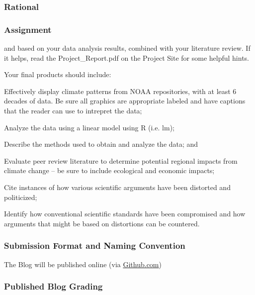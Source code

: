 
\subsubsection{Rational}

\subsubsection{Assignment}

and based on your data analysis results, combined with your literature review. If it helps, read the Project\_Report.pdf on the Project Site for some helpful hints.

Your final products should include:

\begin{itemize*}
  \item Effectively display climate patterns from NOAA repositories, with at least 6 decades of data. Be sure all graphics are appropriate labeled and have captions that the reader can use to intrepret the data;
  \item Analyze the data using a linear model using R (i.e. lm);
  \item Describe the methods used to obtain and analyze the data; and
  \item Evaluate peer review literature to determine potential regional impacts from climate change -- be sure to include ecological and economic impacts; 
  \item Cite instances of how various scientific arguments have been distorted and politicized;
  \item Identify how conventional scientific standards have been compromised and how arguments that might be based on distortions can be countered.
\end{itemize*}


\subsubsection{Submission Format and Naming Convention}

The Blog will be published online (via \url{Github.com}) 

\subsubsection{Published Blog Grading}


